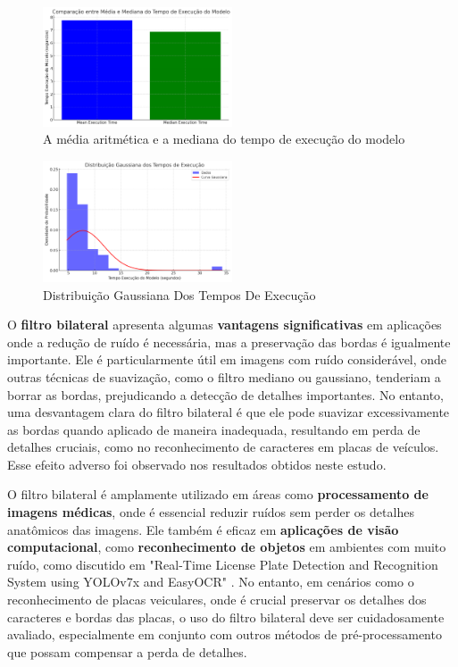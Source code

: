 \documentclass[conference]{IEEEtran}
\begin{document}
\begin{figure}[htbp]
	\centerline{\includegraphics[width=0.5\textwidth]{img14.png}}
	\caption{A média aritmética e a mediana do tempo de execução do modelo}
	\label{img14}
\end{figure}

\begin{figure}[htbp]
	\centerline{\includegraphics[width=0.5\textwidth]{img15.png}}
	\caption{Distribuição Gaussiana Dos Tempos De Execução}
	\label{img15}
\end{figure}

O \textbf{filtro bilateral} apresenta algumas \textbf{vantagens significativas} em aplicações onde a redução de ruído é necessária, mas a preservação das bordas é igualmente importante. Ele é particularmente útil em imagens com ruído considerável, onde outras técnicas de suavização, como o filtro mediano ou gaussiano, tenderiam a borrar as bordas, prejudicando a detecção de detalhes importantes. No entanto, uma desvantagem clara do filtro bilateral é que ele pode suavizar excessivamente as bordas quando aplicado de maneira inadequada, resultando em perda de detalhes cruciais, como no reconhecimento de caracteres em placas de veículos. Esse efeito adverso foi observado nos resultados obtidos neste estudo.

O filtro bilateral é amplamente utilizado em áreas como \textbf{processamento de imagens médicas}, onde é essencial reduzir ruídos sem perder os detalhes anatômicos das imagens. Ele também é eficaz em \textbf{aplicações de visão computacional}, como \textbf{reconhecimento de objetos} em ambientes com muito ruído, como discutido em "Real-Time License Plate Detection and Recognition System using YOLOv7x and EasyOCR" \cite{b2}. No entanto, em cenários como o reconhecimento de placas veiculares, onde é crucial preservar os detalhes dos caracteres e bordas das placas, o uso do filtro bilateral deve ser cuidadosamente avaliado, especialmente em conjunto com outros métodos de pré-processamento que possam compensar a perda de detalhes.
\end{document}
